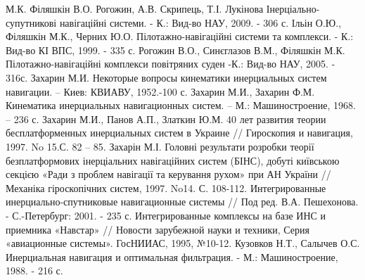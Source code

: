 \begin{thebibliography}{99}
 М.К. Філяшкін В.О. Рогожин, А.В. Скрипець, Т.І. Лукінова Інерціально-супутникові навігаційні  системи. - К.: Вид-во НАУ, 2009. - 306 с.
 Ільін О.Ю., Філяшкін М.К., Черних Ю.О. Пілотажно-навігаційні системи та комплекси. - К.: Вид-во КІ ВПС, 1999. - 335 с.
 Рогожин В.О., Синєглазов В.М., Філяшкін М.К. Пілотажно-навігаційні комплекси повітряних суден -К.: Вид-во НАУ, 2005. - 316с.
 Захарин М.И. Некоторые вопросы кинематики инерциальных систем навигации. – Киев: КВИАВУ, 1952.-100 с.
 Захарин М.И., Захарин Ф.М. Кинематика инерциальных навигационных систем. – М.: Машиностроение, 1968. – 236 с.
 Захарин М.И., Панов А.П., Златкин Ю.М. 40 лет развития теории бесплатформенных инерциальных систем в Украине // Гироскопия и навигация, 1997. No 15.С. 82 – 85.
 Захарін М.І. Головні результати розробки теорії безплатформових інерціальних навігаційних систем (БІНС), добуті київською секцією «Ради з проблем навігації та керування рухом» при АН України // Механіка гіроскопічних систем, 1997. No14. С. 108-112.
 Интегрированные инерциально-спутниковые навигационные системы // Под ред. В.А. Пешехонова. -  С.-Петербург: 2001. - 235 с.
 Интегрированные комплексы на базе ИНС и приемника «Навстар» // Новости зарубежной науки и техники, Серия «авиационные системы». ГосНИИАС, 1995, №10-12.
 Кузовков Н.Т., Салычев О.С. Инерциальная навигация и оптимальная фильтрация. - М.: Машиностроение, 1988.  - 216 с.



\end{thebibliography}
